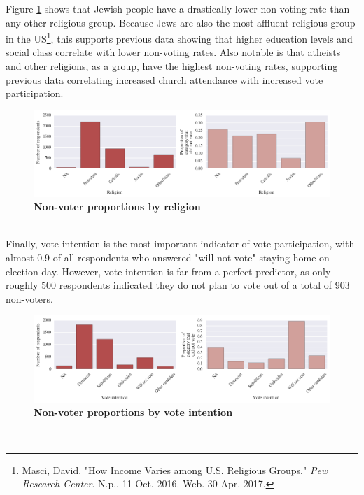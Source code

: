 \documentclass{article}
\begin{document}
	Figure \ref{fig:categorical_religion} shows that Jewish people have a drastically lower non-voting rate than any other religious group. Because Jews are also the most affluent religious group in the US\footnote{Masci, David. "How Income Varies among U.S. Religious Groups." \textit{Pew Research Center}. N.p., 11 Oct. 2016. Web. 30 Apr. 2017.}, this supports previous data showing that higher education levels and social class correlate with lower non-voting rates. Also notable is that atheists and other religions, as a group, have the highest non-voting rates, supporting previous data correlating increased church attendance with increased vote participation.
	\begin{figure}[h!]
		\begin{center}
			\includegraphics*[width=1\linewidth]{categorical_religion}
			\caption{\textbf{Non-voter proportions by religion}}
			\label{fig:categorical_religion}
		\end{center}
	\end{figure}
	\hfill \\
	Finally, vote intention is the most important indicator of vote participation, with almost 0.9 of all respondents who answered "will not vote" staying home on election day. However, vote intention is far from a perfect predictor, as only roughly 500 respondents indicated they do not plan to vote out of a total of 903 non-voters.
	\begin{figure}[h!]
		\begin{center}
			\includegraphics*[width=1\linewidth]{categorical_intent}
			\caption{\textbf{Non-voter proportions by vote intention}}
			\label{fig:categorical_intent}
		\end{center}
	\end{figure}
	\hfill \\
	
\end{document}
